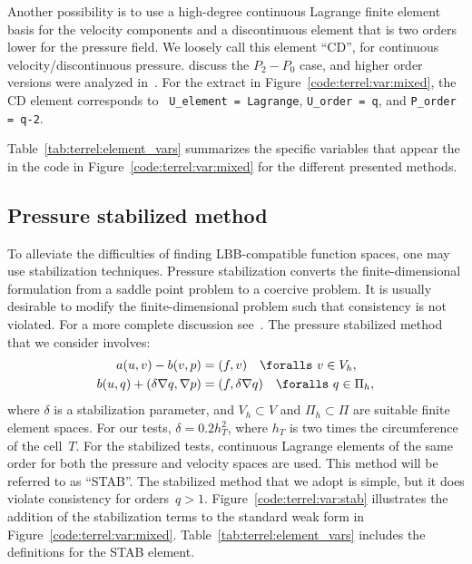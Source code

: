 Another possibility is to use a high-degree continuous Lagrange finite element
basis for the velocity components and a discontinuous element that is two
orders lower for the pressure field. We loosely call this element ``CD'', for
continuous velocity/discontinuous pressure. \citet{BrezziFortin1991} discuss
the $P_2-P_0$ case, and higher order versions were analyzed
in~\citet{MadayPateraRonquist1992}. For the extract in
Figure~\ref{code:terrel:var:mixed}, the CD element corresponds to {\tt
  U\_element = Lagrange}, {\tt U\_order = q},  and {\tt P\_order = q-2}.

Table~\ref{tab:terrel:element_vars} summarizes the specific variables
that appear the in the \ufl code in Figure~\ref{code:terrel:var:mixed}
for the different presented methods.

\subsection{Pressure stabilized method}

To alleviate the difficulties of finding LBB-compatible function
spaces, one may use stabilization techniques.  Pressure stabilization
converts the finite-dimensional formulation from a saddle point
problem to a coercive problem. It is usually desirable to modify the
finite-dimensional problem such that consistency is not violated. For
a more complete discussion see~\citet{DoneaHuerta2003}.  The pressure
stabilized method that we consider involves:
%
\begin{align}
  a(u, v) - b(v, p)
      &=  (f, v) \quad \foralls \ v \in V_{h},
\\
  b(u, q) +  (\delta\nabla{q},\nabla{p}) &=   (f, \delta \nabla q)
\quad \foralls \ q \in \Pi_{h},
\end{align}
%
where $\delta$ is a stabilization parameter, and $V_{h} \subset V$ and
$\Pi_{h} \subset \Pi$ are suitable finite element spaces. For our tests,
$\delta = 0.2 h_{T}^{2}$, where $h_{T}$ is two times the circumference
of the cell~$T$.  For the stabilized tests, continuous Lagrange
elements of the same order for both the pressure and velocity spaces
are used. This method will be referred to as ``STAB''. The stabilized
method that we adopt is simple, but it does violate consistency
for orders~$q > 1$.  Figure~\ref{code:terrel:var:stab} illustrates
the addition of the stabilization terms to the standard weak form in
Figure~\ref{code:terrel:var:mixed}.  Table~\ref{tab:terrel:element_vars}
includes the definitions for the STAB element.

